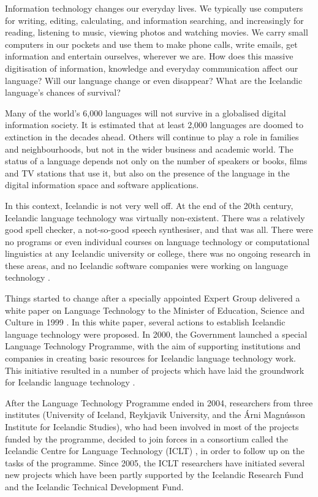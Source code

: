 \begin{multicols}{2}

Information technology changes our everyday lives. We typically use computers for writing, editing, calculating, and information searching, and increasingly for reading, listening to music, viewing photos and watching movies. We carry small computers in our pockets and use them to make phone calls, write emails, get information and entertain ourselves, wherever we are. How does this massive digitisation of information, knowledge and everyday communication affect our language? Will our language change or even disappear? What are the Icelandic language’s chances of survival?

Many of the world’s 6,000 languages will not survive in a globalised digital information society. It is estimated that at least 2,000 languages are doomed to extinction in the decades ahead. Others will continue to play a role in families and neighbourhoods, but not in the wider business and academic world. The status of a language depends not only on the number of speakers or books, films and TV stations that use it, but also on the presence of the language in the digital information space and software applications. 

In this context, Icelandic is not very well off. At the end of the 20th century, Icelandic language technology was virtually non-existent. There was a relatively good spell checker, a not-so-good speech synthesiser, and that was all. There were no programs or even individual courses on language technology or computational linguistics at any Icelandic university or college, there was no ongoing research in these areas, and no Icelandic software companies were working on language technology \cite{ilrt1}. 
\columnbreak

Things started to change after a specially appointed Expert Group delivered a white paper on Language Technology to the Minister of Education, Science and Culture in 1999 \cite{sky1}.  In this white paper, several actions to establish Icelandic language technology were proposed. In 2000, the Government launched a special Language Technology Programme, with the aim of supporting institutions and companies in creating basic resources for Icelandic language technology work. This initiative resulted in a number of projects which have laid the groundwork for Icelandic language technology \cite{ilrt1}.

After the Language Technology Programme ended in 2004, researchers from three institutes (University of Iceland, Reykjavik University, and the Árni Magnússon Institute for Icelandic Studies), who had been involved in most of the projects funded by the programme, decided to join forces in a consortium called the Icelandic Centre for Language Technology (ICLT) \cite{iclt1}, in order to follow up on the tasks of the programme. Since 2005, the ICLT researchers have initiated several new projects which have been partly supported by the Icelandic Research Fund and the Icelandic Technical Development Fund.


\end{multicols}
